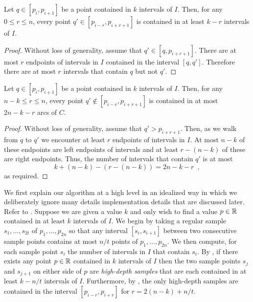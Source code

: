 \documentclass[charterfonts,lotsofwhite]{patmorin}
\begin{document}
\begin{lem}
Let $q\in[p_i,p_{i+1}]$ be a point contained in $k$ intervals of $I$.
Then, for any $0\le r\le n$, every point $q'\in[p_{i-r},p_{i+r+1}]$ is
contained in at least $k-r$ intervals of $I$.
\end{lem}

\begin{proof}
Without loss of generality, assume that $q'\in[q,p_{i+r+1}]$.  There are
at most $r$ endpoints of intervals in $I$ contained in the interval
$[q,q']$.  Therefore there are at most $r$ intervals that contain $q$
but not $q'$.
\end{proof}

\begin{lem}
Let $q\in[p_i,p_{i+1}]$ be a point contained in $k$ intervals of $I$.
Then, for any $n-k \le r\le n$, every point $q'\notin[p_{i-r},p_{i+r+1}]$ 
is contained in at most $2n-k-r$ arcs of $C$.
\end{lem}

\begin{proof}
Without loss of generality, assume that $q'> p_{i+r+1}$.  Then, as we
walk from $q$ to $q'$ we encounter at least $r$ endpoints of intervals
in $I$.  At most $n-k$ of these endpoints are left endpoints of
intervals and at least $r-(n-k)$ of these are right endpoints.  Thus,
the number of intervals that contain $q'$ is at most
\[
      k + (n-k) - (r-(n-k)) = 2n - k - r \enspace ,
\]
as required.
\end{proof}

We first explain our algorithm at a high level in an idealized way in
which we deliberately ignore many details implementation details that
are discussed later.  Refer to . Suppose we are
given a value $k$ and only wish to find a value $p\in\mathbb{R}$ contained in
at least $k$ intervals of $I$.  We begin by taking a regular sample
$s_1,\ldots,s_{2t}$ of $p_1,\ldots,p_{2n}$ so that any interval
$[s_i,s_{i+1}]$ between two consecutive sample points contains at most
$n/t$ points of $p_1,\ldots,p_{2n}$.  We then compute, for each sample
point $s_i$ the number of intervals in $I$ that contain $s_i$.  By
, if there exists any point $p\in \mathbb{R}$ contained in $k$
intervals of $I$ then the two sample points $s_j$ and $s_{j+1}$ on
either side of $p$ are \emph{high-depth samples} that are each
contained in at least $k-n/t$ intervals of $I$.  Furthermore, by
, the only high-depth samples are contained in the
interval $[p_{i-r},p_{i+r}]$ for $r=2(n-k)+n/t$.  
\end{document}
